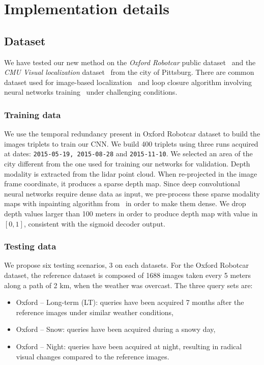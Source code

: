 \section{Implementation details}
\label{sec:impl_details}



\subsection{Dataset}
\label{subsec:dataset}
	We have tested our new method on the \textit{Oxford Robotcar} public dataset~\cite{Maddern2016} and the \textit{CMU Visual localization} dataset~\cite{Bansal2014a} from the city of Pittsburg. There are common dataset used for image-based localization~\cite{Sattler2018} and loop closure algorithm involving neural networks training~\cite{Porav2018} under challenging conditions.
		
\subsubsection{Training data}
	We use the temporal redundancy present in Oxford Robotcar dataset to build the images triplets to train our CNN. We build 400 triplets using three runs acquired at dates: \texttt{2015-05-19, 2015-08-28} and \texttt{2015-11-10}. We selected an area of the city different from the one used for training our networks for validation.
	Depth modality is extracted from the lidar point cloud. When re-projected in the image frame coordinate, it produces a sparse depth map. Since deep convolutional neural networks require dense data as input, we pre-process these sparse modality maps with inpainting algorithm from~\cite{Bevilacqua2017} in order to make them dense. We drop depth values larger than 100 meters in order to produce depth map with value in $[0, 1]$, consistent with the sigmoid decoder output.

\subsubsection{Testing data}
We propose six testing scenarios, 3 on each datasets. For the Oxford Robotcar dataset, the reference dataset is composed of 1688 images taken every 5 meters along a path of 2 km, when the weather was overcast. The three query sets are:
\begin{itemize}
	\item {Oxford -- Long-term (LT):} queries have been acquired 7 months after the reference images under similar weather conditions,
	\item {Oxford -- Snow:} queries have been acquired during a snowy day,
	\item {Oxford -- Night:} queries have been acquired at night, resulting in radical visual changes compared to the reference images.
\end{itemize}

